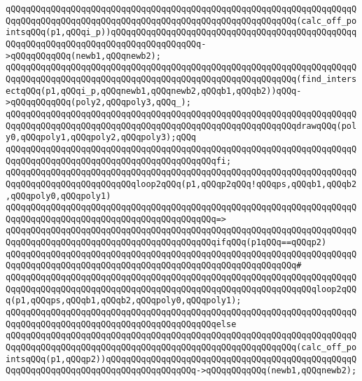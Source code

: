\verb|qQQqqQQqqQQqqQQqqQQqqQQqqQQqqQQqqQQqqQQqqQQqqQQqqQQqqQQqqQQqqQQqqQQqqQQqqQQqqQQqqQQqqQQqqQQqqQQqqQQqqQQqqQQqqQQqqQQqqQQqqQQqqQQq(calc_off_pointsqQQq(p1,qQQqi_p))qQQqqQQqqQQqqQQqqQQqqQQqqQQqqQQqqQQqqQQqqQQqqQQqqQQqqQQqqQQqqQQqqQQqqQQqqQQqqQQqqQQqqQQq->qQQqqQQqqQQq(newb1,qQQqnewb2);|\newline
\verb|qQQqqQQqqQQqqQQqqQQqqQQqqQQqqQQqqQQqqQQqqQQqqQQqqQQqqQQqqQQqqQQqqQQqqQQqqQQqqQQqqQQqqQQqqQQqqQQqqQQqqQQqqQQqqQQqqQQqqQQqqQQqqQQq(find_intersectqQQq(p1,qQQqi_p,qQQqnewb1,qQQqnewb2,qQQqb1,qQQqb2))qQQq->qQQqqQQqqQQq(poly2,qQQqpoly3,qQQq_);|\newline
\newline
\verb|qQQqqQQqqQQqqQQqqQQqqQQqqQQqqQQqqQQqqQQqqQQqqQQqqQQqqQQqqQQqqQQqqQQqqQQqqQQqqQQqqQQqqQQqqQQqqQQqqQQqqQQqqQQqqQQqqQQqqQQqqQQqqQQqdrawqQQq(poly0,qQQqpoly1,qQQqpoly2,qQQqpoly3);qQQq|\newline
\verb|qQQqqQQqqQQqqQQqqQQqqQQqqQQqqQQqqQQqqQQqqQQqqQQqqQQqqQQqqQQqqQQqqQQqqQQqqQQqqQQqqQQqqQQqqQQqqQQqqQQqqQQqqQQqqQQqfi;|\newline
\newline
\verb|qQQqqQQqqQQqqQQqqQQqqQQqqQQqqQQqqQQqqQQqqQQqqQQqqQQqqQQqqQQqqQQqqQQqqQQqqQQqqQQqqQQqqQQqqQQqqQQqloop2qQQq(p1,qQQqp2qQQq!qQQqps,qQQqb1,qQQqb2,qQQqpoly0,qQQqpoly1)|\newline
\verb|qQQqqQQqqQQqqQQqqQQqqQQqqQQqqQQqqQQqqQQqqQQqqQQqqQQqqQQqqQQqqQQqqQQqqQQqqQQqqQQqqQQqqQQqqQQqqQQqqQQqqQQqqQQqqQQq=>|\newline
\verb|qQQqqQQqqQQqqQQqqQQqqQQqqQQqqQQqqQQqqQQqqQQqqQQqqQQqqQQqqQQqqQQqqQQqqQQqqQQqqQQqqQQqqQQqqQQqqQQqqQQqqQQqqQQqqQQqifqQQq(p1qQQq==qQQqp2)|\newline
\verb|qQQqqQQqqQQqqQQqqQQqqQQqqQQqqQQqqQQqqQQqqQQqqQQqqQQqqQQqqQQqqQQqqQQqqQQqqQQqqQQqqQQqqQQqqQQqqQQqqQQqqQQqqQQqqQQqqQQqqQQqqQQqqQQq#|\newline
\verb|qQQqqQQqqQQqqQQqqQQqqQQqqQQqqQQqqQQqqQQqqQQqqQQqqQQqqQQqqQQqqQQqqQQqqQQqqQQqqQQqqQQqqQQqqQQqqQQqqQQqqQQqqQQqqQQqqQQqqQQqqQQqqQQqqQQqloop2qQQq(p1,qQQqps,qQQqb1,qQQqb2,qQQqpoly0,qQQqpoly1);|\newline
\verb|qQQqqQQqqQQqqQQqqQQqqQQqqQQqqQQqqQQqqQQqqQQqqQQqqQQqqQQqqQQqqQQqqQQqqQQqqQQqqQQqqQQqqQQqqQQqqQQqqQQqqQQqqQQqqQQqelse|\newline
\verb|qQQqqQQqqQQqqQQqqQQqqQQqqQQqqQQqqQQqqQQqqQQqqQQqqQQqqQQqqQQqqQQqqQQqqQQqqQQqqQQqqQQqqQQqqQQqqQQqqQQqqQQqqQQqqQQqqQQqqQQqqQQqqQQq(calc_off_pointsqQQq(p1,qQQqp2))qQQqqQQqqQQqqQQqqQQqqQQqqQQqqQQqqQQqqQQqqQQqqQQqqQQqqQQqqQQqqQQqqQQqqQQqqQQqqQQqqQQqqQQq->qQQqqQQqqQQq(newb1,qQQqnewb2);|\newline
